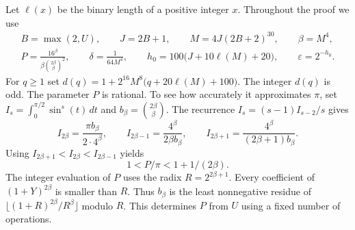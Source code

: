\documentclass[11pt,letterpaper]{article}
\numberwithin{equation}{section}
\begin{document}
Let $\ell(x)$ be the binary length of a positive integer $x$. Throughout the proof we use
\begin{equation}\label{eq:packing-grid}
 \begin{gathered}
 B=\max(2,U),\qquad J=2B+1,\qquad M=4J(2B+2)^{30},\qquad \beta=M^4,\\
 P=\frac{16^\beta}{\beta\binom{2\beta}{\beta}^{2}},\qquad
 \delta=\frac{1}{64M^4},\qquad
 h_0=100\bigl(J+10\ell(M)+20\bigr),\qquad \varepsilon=2^{-h_0}.
 \end{gathered}
\end{equation}
For $q\ge1$ set $d(q)=1+2^{16}M^8\bigl(q+20\ell(M)+100\bigr)$.
The integer $d(q)$ is odd. The parameter $P$ is rational. To see how
accurately it approximates $\pi$, set
$I_s=\int_0^{\pi/2}\sin^s(t)\,dt$ and
$b_\beta=\binom{2\beta}{\beta}$. The recurrence
$I_s=(s-1)I_{s-2}/s$ gives
\[
 I_{2\beta}=\frac{\pi b_\beta}{2\cdot 4^\beta},\qquad
 I_{2\beta-1}=\frac{4^\beta}{2\beta b_\beta},\qquad
 I_{2\beta+1}=\frac{4^\beta}{(2\beta+1)b_\beta}.
\]
Using $I_{2\beta+1}<I_{2\beta}<I_{2\beta-1}$ yields
\begin{equation}
 1<P/\pi<1+1/(2\beta).
 \label{eq:packing-wallis}
\end{equation}
The integer evaluation of $P$ uses the radix $R=2^{2\beta+1}$.
Every coefficient of $(1+Y)^{2\beta}$ is smaller than $R$.
Thus $b_\beta$ is the least nonnegative residue of
$\lfloor(1+R)^{2\beta}/R^\beta\rfloor$ modulo $R$.
This determines $P$ from $U$ using a fixed number of operations.
\end{document}
